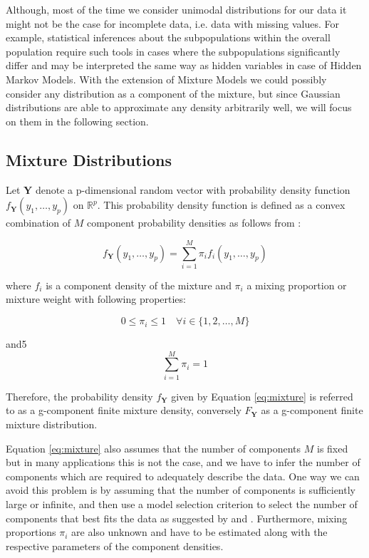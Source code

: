 Although, most of the time we consider unimodal distributions for our data it might not be the case for incomplete data, i.e. data with missing values.
For example, statistical inferences about the subpopulations within the overall population require such tools in cases where the subpopulations significantly differ 
and may be interpreted the same way as hidden variables in case of Hidden Markov Models. With the extension of Mixture Models we could possibly consider any
distribution as a component of the mixture, but since Gaussian distributions are able to approximate any density arbitrarily well, we will focus on them in the following section.

\subsection{Mixture Distributions}

Let $\textbf{Y}$ denote a p-dimensional random vector with probability density function $f_{\textbf{Y}}(y_1,\ldots,y_p)$ on $\mathbb{R}^p$. 
This probability density function is defined as a convex combination of $M$ component probability densities as follows from \citep{McLachlan2000}: 

\begin{equation} \label{eq:mixture}
    f_{\textbf{Y}}(y_1,\ldots,y_p) = \sum_{i=1}^{M} \pi_i f_i(y_1,\ldots,y_p)
\end{equation}

where $f_i$ is a component density of the mixture and $\pi_i$ a mixing proportion or mixture weight with following properties:

\begin{equation}
    0 \leq \pi_i \leq 1 \quad \forall i \in \{1,2,\ldots,M\}
\end{equation}

and5
\begin{equation}
    \sum_{i=1}^{M} \pi_i = 1
\end{equation}

Therefore, the probability density $f_{\textbf{Y}}$ given by Equation \ref{eq:mixture} is referred to as a g-component finite mixture density, conversely $F_{\textbf{Y}}$ 
as a g-component finite mixture distribution. 

Equation \ref{eq:mixture} also assumes that the number of components $M$ is fixed but in many applications this is not the case, and we have to infer 
the number of components which are required to adequately describe the data. One way we can avoid this problem is by assuming that the number of components is 
sufficiently large or infinite, and then use a model selection criterion to select the number of components that best fits the data as suggested by \citep{Sammut2011} and \citep{Rasmussen1999}.
Furthermore, mixing proportions $\pi_i$ are also unknown and have to be estimated along with the respective parameters of the component densities.

